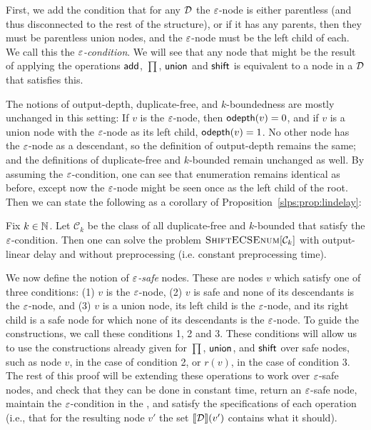 
	First, we add the condition that for any \dsabbr $\mathcal{D}$ the $\varepsilon$-node is either parentless (and thus disconnected to the rest of the structure), or if it has any parents, then they must be parentless union nodes, and the $\varepsilon$-node must be the left child of each. We call this the {\it $\varepsilon$-condition}. We will see that any node that might be the result of applying the operations $\mathsf{add}$, $\prod$, $\mathsf{union}$ and $\mathsf{shift}$ is equivalent to a node in a \dsabbr $\mathcal{D}$ that satisfies this. 
	
	The notions of output-depth, duplicate-free, and $k$-boundedness are mostly unchanged in this setting: If $v$ is the $\varepsilon$-node, then $\mathsf{odepth}(v) = 0$, and if $v$ is a union node with the $\varepsilon$-node as its left child, $\mathsf{odepth}(v) = 1$. No other node has the $\varepsilon$-node as a descendant, so the definition of output-depth remains the same; and the definitions of duplicate-free and $k$-bounded remain unchanged as well. By assuming the $\varepsilon$-condition, one can see that enumeration remains identical as before, except now the $\varepsilon$-node might be seen once as the left child of the root. Then we can state the following as a corollary of Proposition~\ref{slps:prop:lindelay}:
	
	\begin{corollary}\label{slps:prop:lindelayeps}
		Fix $k\in\mathbb{N}$. Let $\mathcal{C}_k$ be the class of all  duplicate-free and $k$-bounded \dsabbrs{} that satisfy the $\varepsilon$-condition. Then one can solve the problem $\textsc{ShiftECSEnum}[\mathcal{C}_k]$ with output-linear delay and without preprocessing (i.e. constant preprocessing time).
	\end{corollary}
	
	
	We now define the notion of {\it $\varepsilon$-safe} nodes. These are nodes $v$ which satisfy one of three conditions: (1) $v$ is the $\varepsilon$-node, (2) $v$ is safe and none of its descendants is the $\varepsilon$-node, and (3) $v$ is a union node, its left child is the $\varepsilon$-node, and its right child is a safe node for which none of its descendants is the $\varepsilon$-node. 
	To guide the constructions, we call these conditions 1, 2 and 3.
	These conditions will allow us to use the constructions already given for $\prod$, $\mathsf{union}$, and $\mathsf{shift}$ over safe nodes, such as node $v$, in the case of condition 2, or $r(v)$, in the case of condition 3.
	The rest of this proof will be extending these operations to work over $\varepsilon$-safe nodes, and check that they can be done in constant time, return an $\varepsilon$-safe node, maintain the $\varepsilon$-condition in the \dsabbr, and satisfy the specifications of each operation (i.e., that for the resulting node $v'$ the set ${\llbracket{\mathcal{D}}\rrbracket}(v')$ contains what it should). 
	
